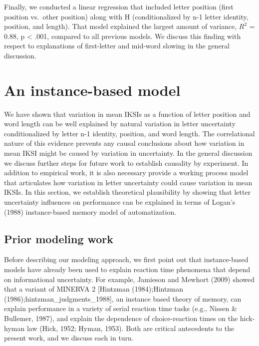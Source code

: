 \documentclass[,man,floatsintext]{apa6}
\begin{document}
Finally, we conducted a linear regression that included letter position (first position vs.~other position) along with H (conditionalized by n-1 letter identity, position, and length). That model explained the largest amount of variance, \(R^2\) = 0.88, p \textless{} .001, compared to all previous models. We discuss this finding with respect to explanations of first-letter and mid-word slowing in the general discussion.

\hypertarget{an-instance-based-model}{%
\section{An instance-based model}\label{an-instance-based-model}}

We have shown that variation in mean IKSIs as a function of letter position and word length can be well explained by natural variation in letter uncertainty conditionalized by letter n-1 identity, position, and word length. The correlational nature of this evidence prevents any causal conclusions about how variation in mean IKSI might be caused by variation in uncertainty. In the general discussion we discuss further steps for future work to establish causality by experiment. In addition to empirical work, it is also necessary provide a working process model that articulates how variation in letter uncertainty could cause variation in mean IKSIs. In this section, we establish theoretical plausibility by showing that letter uncertainty influences on performance can be explained in terms of Logan's (1988) instance-based memory model of automatization.

\hypertarget{prior-modeling-work}{%
\subsection{Prior modeling work}\label{prior-modeling-work}}

Before describing our modeling approach, we first point out that instance-based models have already been used to explain reaction time phenomena that depend on informational uncertainty. For example, Jamieson and Mewhort (2009) showed that a variant of MINERVA 2 {[}Hintzman (1984);Hintzman (1986);hintzman\_judgments\_1988{]}, an instance based theory of memory, can explain performance in a variety of serial reaction time tasks (e.g., Nissen \& Bullemer, 1987), and explain the dependence of choice-reaction times on the hick-hyman law (Hick, 1952; Hyman, 1953). Both are critical antecedents to the present work, and we discuss each in turn.
\end{document}
